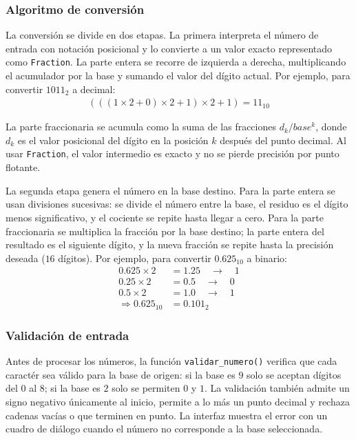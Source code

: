 \documentclass[a4paper,12pt]{article}
\begin{document}
\subsubsection{Algoritmo de conversi\'{o}n}

La conversi\'{o}n se divide en dos etapas. La primera interpreta el n\'{u}mero de entrada con notaci\'{o}n posicional y lo convierte a un valor exacto representado como \texttt{Fraction}. La parte entera se recorre de izquierda a derecha, multiplicando el acumulador por la base y sumando el valor del d\'{i}gito actual. Por ejemplo, para convertir $1011_2$ a decimal:
\begin{align*}
    (((1 \times 2 + 0) \times 2 + 1) \times 2 + 1) = 11_{10}
\end{align*}

La parte fraccionaria se acumula como la suma de las fracciones $d_k / base^k$, donde $d_k$ es el valor posicional del d\'{i}gito en la posici\'{o}n $k$ despu\'{e}s del punto decimal. Al usar \texttt{Fraction}, el valor intermedio es exacto y no se pierde precisi\'{o}n por punto flotante.

La segunda etapa genera el n\'{u}mero en la base destino. Para la parte entera se usan divisiones sucesivas: se divide el n\'{u}mero entre la base, el residuo es el d\'{i}gito menos significativo, y el cociente se repite hasta llegar a cero. Para la parte fraccionaria se multiplica la fracci\'{o}n por la base destino; la parte entera del resultado es el siguiente d\'{i}gito, y la nueva fracci\'{o}n se repite hasta la precisi\'{o}n deseada ($16$ d\'{i}gitos). Por ejemplo, para convertir $0.625_{10}$ a binario:
\begin{align*}
    0.625 \times 2 &= 1.25 \quad \rightarrow \quad 1 \\
    0.25 \times 2 &= 0.5 \quad \rightarrow \quad 0 \\
    0.5 \times 2 &= 1.0 \quad \rightarrow \quad 1 \\
    \Rightarrow 0.625_{10} &= 0.101_2
\end{align*}

\subsubsection{Validaci\'{o}n de entrada}

Antes de procesar los n\'{u}meros, la funci\'{o}n \texttt{validar\_numero()} verifica que cada caract\'{e}r sea v\'{a}lido para la base de origen: si la base es $9$ solo se aceptan d\'{i}gitos del $0$ al $8$; si la base es $2$ solo se permiten $0$ y $1$. La validaci\'{o}n tambi\'{e}n admite un signo negativo \'{u}nicamente al inicio, permite a lo m\'{a}s un punto decimal y rechaza cadenas vac\'{i}as o que terminen en punto. La interfaz muestra el error con un cuadro de di\'{a}logo cuando el n\'{u}mero no corresponde a la base seleccionada.
\end{document}
